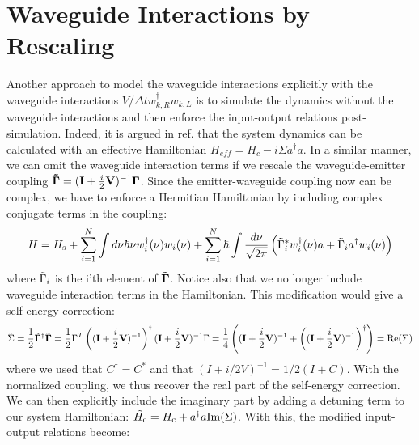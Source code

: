 \section{Waveguide Interactions by Rescaling} \label{sec:inferringwaveguide}
Another approach to model the waveguide interactions explicitly with the waveguide interactions $V/\Delta t w_{k,R}^\dagger w_{k,L}$ is to simulate the dynamics without the waveguide interactions and then enforce the input-output relations post-simulation. Indeed, it is argued in ref. \cite{Xu2016FanoTransport} that the system dynamics can be calculated with an effective Hamiltonian $H_{eff} = H_c - i\Sigma a^\dagger a$. In a similar manner, we can omit the waveguide interaction terms if we rescale the waveguide-emitter coupling $\mathbf{\Tilde{\Gamma}} = (\mathbf{I} + \frac{i}{2}\mathbf{V})^{-1} \mathbf{\Gamma}$. Since the emitter-waveguide coupling now can be complex, we have to enforce a Hermitian Hamiltonian by including complex conjugate terms in the coupling:
\begin{equation}
\begin{aligned}
H= H_{\mathrm{s}}+ \sum_{i=1}^N \int d \nu \hbar \nu w_{i}^{\dagger}(\nu) w_{i}(\nu)+\sum_{i=1}^N \hbar \int \frac{d \nu}{\sqrt{2 \pi}}\left(\Tilde{\Gamma}_i^* w_{i}^{\dagger}(\nu) a+ \Tilde{\Gamma}_i a^{\dagger} w_{i}(\nu)\right) \label{eq:modifiedFAN}
\end{aligned}
\end{equation}
where $\Tilde{\Gamma}_i$ is the i'th element of $\Tilde{\mathbf{\Gamma}}$. Notice also that we no longer include waveguide interaction terms in the Hamiltonian. This modification would give a self-energy correction:
\begin{equation}
    \Tilde{\Sigma} = \frac{1}{2} \mathbf{\Tilde{\Gamma}}^\dagger \mathbf{\Tilde{\Gamma}} = \frac{1}{2} \Gamma^T \left ((\mathbf{I} + \frac{i}{2}\mathbf{V})^{-1}\right)^\dagger (\mathbf{I} + \frac{i}{2}\mathbf{V})^{-1} \Gamma = \frac{1}{4}\left (  (\mathbf{I} + \frac{i}{2}\mathbf{V})^{-1} + \left( (\mathbf{I} + \frac{i}{2}\mathbf{V})^{-1}\right)^\dagger \right) = \mathrm{Re}(\Sigma)
\end{equation}
where we used that $C^\dagger = C^*$ and that $(I + i/2 V)^{-1} = 1/2(I+C)$. With the normalized coupling, we thus recover the real part of the self-energy correction. We can then explicitly include the imaginary part by adding a detuning term to our system Hamiltonian: $\Tilde{H_{\mathrm{c}}} = H_{\mathrm{c}} + a^\dagger a \mathrm{Im}(\Sigma)$. With this, the modified input-output relations become:
